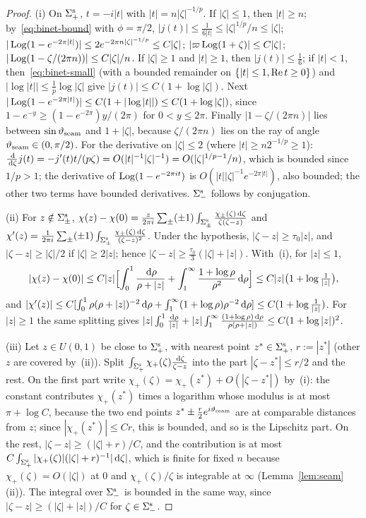 \begin{proof}
(i) On $\Sigma^{\mathrm{s}}_+$, $t=-i|t|$ with $|t|=n|\zeta|^{-1/p}$. If $|\zeta|\le1$, then $|t|\ge n$; by~\eqref{eq:binet-bound} with
$\phi=\pi/2$, $|j(t)|\le\frac1{6|t|}\le|\zeta|^{1/p}/n\le|\zeta|$; $|\operatorname{Log}(1-e^{-2\pi|t|})|\le2e^{-2\pi n|\zeta|^{-1/p}}\le C|\zeta|$;
$|\varpi\operatorname{Log}(1+\zeta)|\le C|\zeta|$; $|\operatorname{Log}(1-\zeta/(2\pi n))|\le C|\zeta|/n$. If $|\zeta|\ge1$ and $|t|\ge1$, then
$|j(t)|\le\frac16$; if $|t|<1$, then~\eqref{eq:binet-small} (with a bounded remainder on $\{|t|\le1,\operatorname{Re} t\ge0\}$) and
$|\log|t||\le\frac1p\log|\zeta|$ give $|j(t)|\le C(1+\log|\zeta|)$. Next $|\operatorname{Log}(1-e^{-2\pi|t|})|\le C(1+|\log|t||)\le
C(1+\log|\zeta|)$, since $1-e^{-y}\ge(1-e^{-2\pi})y/(2\pi)$ for $0<y\le2\pi$. Finally $|1-\zeta/(2\pi n)|$ lies between
$\sin\vartheta_{\mathrm{seam}}$ and $1+|\zeta|$, because $\zeta/(2\pi n)$ lies on the ray of angle $\vartheta_{\mathrm{seam}}\in(0,\pi/2)$. For the derivative on
$|\zeta|\le2$ (where $|t|\ge n2^{-1/p}\ge1$): $\frac{\,\mathrm{d}}{\,\mathrm{d}\zeta}j(t)=-j'(t)t/(p\zeta)=O(|t|^{-1}|\zeta|^{-1})=
O(|\zeta|^{1/p-1}/n)$, which is bounded since $1/p>1$; the derivative of $\operatorname{Log}(1-e^{-2\pi it})$ is
$O(|t||\zeta|^{-1}e^{-2\pi|t|})$, also bounded; the other two terms have bounded derivatives. $\Sigma^{\mathrm{s}}_-$ follows by
conjugation.

(ii) For $z\notin\Sigma^{\mathrm{s}}_\pm$,
$\chi(z)-\chi(0)=\frac z{2\pi i}\sum_\pm(\pm1)\int_{\Sigma^{\mathrm{s}}_\pm}\frac{\chi_\pm(\zeta)\,\mathrm{d}\zeta}{\zeta(\zeta-z)}$ and
$\chi'(z)=\frac1{2\pi i}\sum_\pm(\pm1)\int_{\Sigma^{\mathrm{s}}_\pm}\frac{\chi_\pm(\zeta)\,\mathrm{d}\zeta}{(\zeta-z)^2}$. Under the hypothesis,
$|\zeta-z|\ge\tau_0|z|$, and $|\zeta-z|\ge|\zeta|/2$ if $|\zeta|\ge2|z|$; hence $|\zeta-z|\ge\frac{\tau_0}3(|\zeta|+|z|)$.
With~(i), for $|z|\le1$,
\[
  |\chi(z)-\chi(0)|\le C|z|\Bigl[\int_0^1\frac{\,\mathrm{d}\rho}{\rho+|z|}+\int_1^\infty\frac{1+\log\rho}{\rho^2}\,\mathrm{d}\rho\Bigr]\le
  C|z|\bigl(1+\log\tfrac1{|z|}\bigr),
\]
and $|\chi'(z)|\le C[\int_0^1\rho(\rho+|z|)^{-2}\,\mathrm{d}\rho+\int_1^\infty(1+\log\rho)\rho^{-2}\,\mathrm{d}\rho]\le C(1+\log\frac1{|z|})$.
For $|z|\ge1$ the same splitting gives
$|z|\int_0^1\frac{\,\mathrm{d}\rho}{|z|}+|z|\int_1^\infty\frac{(1+\log\rho)\,\mathrm{d}\rho}{\rho(\rho+|z|)}\le C(1+\log|z|)^2$.

(iii) Let $z\in U(0,1)$ be close to $\Sigma^{\mathrm{s}}_+$, with nearest point $z^*\in\Sigma^{\mathrm{s}}_+$, $r:=|z^*|$ (other $z$ are covered
by~(ii)). Split $\int_{\Sigma^{\mathrm{s}}_+}\chi_+(\zeta)\frac{\,\mathrm{d}\zeta}{\zeta-z}$ into the part $|\zeta-z^*|\le r/2$ and the rest. On
the first part write $\chi_+(\zeta)=\chi_+(z^*)+O(|\zeta-z^*|)$ by~(i): the constant contributes $\chi_+(z^*)$ times a
logarithm whose modulus is at most $\pi+\log C$, because the two end points $z^*\pm\frac r2e^{i\vartheta_{\mathrm{seam}}}$ are at comparable
distances from $z$; since $|\chi_+(z^*)|\le Cr$, this is bounded, and so is the Lipschitz part. On the rest,
$|\zeta-z|\ge(|\zeta|+r)/C$, and the contribution is at most $C\int_{\Sigma^{\mathrm{s}}_+}|\chi_+(\zeta)|(|\zeta|+r)^{-1}|\,\mathrm{d}\zeta|$, which
is finite for fixed $n$ because $\chi_+(\zeta)=O(|\zeta|)$ at $0$ and $\chi_+(\zeta)/\zeta$ is integrable at $\infty$
(Lemma~\ref{lem:seam}(ii)). The integral over $\Sigma^{\mathrm{s}}_-$ is bounded in the same way, since
$|\zeta-z|\ge(|\zeta|+|z|)/C$ for $\zeta\in\Sigma^{\mathrm{s}}_-$.
\end{proof}
